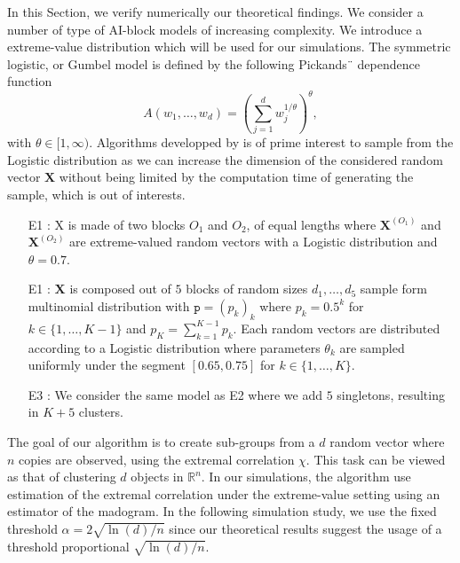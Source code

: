 \documentclass[11pt]{article}
\begin{document}
	In this Section, we verify numerically our theoretical findings. We consider a number of type of AI-block models of increasing complexity. We introduce a extreme-value distribution which will be used for our simulations. The symmetric logistic, or Gumbel model \cite{gumbel1960} is defined by the   following Pickands¨ dependence function
            \begin{equation*}
                A(w_1,\dots,w_d) = \left( \sum_{j=1}^d w_j^{1/\theta}\right)^{\theta},
            \end{equation*}
            with $\theta \in [1, \infty)$. Algorithms developped by \cite{stephenson2003simulating} is of prime interest to sample from the Logistic distribution as we can increase the dimension of the considered random vector $\textbf{X}$ without being limited by the computation time of generating the sample, which is out of interests.
            
    \begin{itemize}
    		\item[E1 :] X is made of two blocks $O_1$ and $O_2$, of equal lengths where $\textbf{X}^{(O_1)}$ and $\textbf{X}^{(O_2)}$ are extreme-valued random vectors with a Logistic distribution and $\theta = 0.7$. \label{exp:E1}
    		\item[E1 :] $\textbf{X}$ is composed out of $5$ blocks of random sizes $d_1,\dots,d_5$ sample form multinomial distribution with $\texttt{p} = (p_k)_{k}$ where $p_k = 0.5^k$ for $k \in \{1,\dots,K-1\}$ and $p_K = \sum_{k=1}^{K-1} p_k$. Each random vectors are distributed according to a Logistic distribution where parameters $\theta_k$ are sampled uniformly under the segment $[0.65, 0.75]$ for $k \in \{1,\dots,K\}$. \label{exp:E2}
    		\item[E3 :] We consider the same model as E2 where we add $5$ singletons, resulting in $K+5$ clusters. \label{exp:E3}
    \end{itemize}
    
    The goal of our algorithm is to create sub-groups from a $d$ random vector where $n$ copies are observed, using the extremal correlation $\chi$. This task can be viewed as that of clustering $d$ objects in $\mathbb{R}^n$. In our simulations, the algorithm use estimation of the extremal correlation under the extreme-value setting using an estimator of the madogram. In the following simulation study, we use the fixed threshold $\alpha = 2 \sqrt{\ln(d)/n}$ since our theoretical results suggest the usage of a threshold proportional $\sqrt{\ln(d)/n}$. 
    
\end{document}
